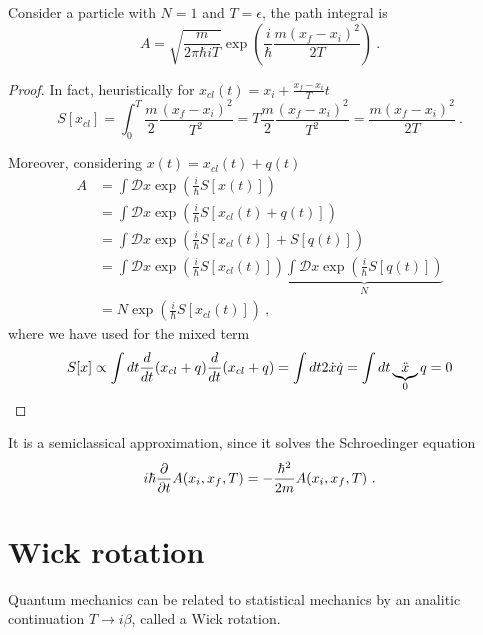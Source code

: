     Consider a particle with $N = 1$ and $T = \epsilon$, the path integral is 
    \begin{equation*}
        A = \sqrt{\frac{m}{2\pi\hbar i T}} \exp(\frac{i}{\hbar} \frac{m(x_f - x_i)^2}{2T}) ~.
    \end{equation*}
    \begin{proof}
        In fact, heuristically for $x_{cl} (t) = x_i + \frac{x_f - x_i}{T} t$
        \begin{equation*}
            S[x_{cl}] = \int_0^T \frac{m}{2} \frac{(x_f - x_i)^2}{T^2} = T \frac{m}{2} \frac{(x_f - x_i)^2}{T^2} =  \frac{m(x_f - x_i)^2}{2T} ~.
        \end{equation*}

        Moreover, considering $x(t) = x_{cl}(t) + q(t)$
        \begin{equation*}
        \begin{aligned}
            A & = \int \mathcal D x \exp (\frac{i}{\hbar} S[x(t)]) \\ & = \int \mathcal D x \exp (\frac{i}{\hbar} S[x_{cl}(t) + q(t)]) \\ & = \int \mathcal D x \exp (\frac{i}{\hbar} S[x_{cl}(t)] + S [q(t)]) \\ & = \int \mathcal D x \exp (\frac{i}{\hbar} S[x_{cl}(t)]) \underbrace{\int \mathcal D x \exp (\frac{i}{\hbar} S [q(t)])}_N \\ & = N \exp(\frac{i}{\hbar} S[x_{cl}(t)]) ~,
        \end{aligned}
        \end{equation*}
        where we have used for the mixed term
        \begin{equation*}
            S[x] \propto \int dt \frac{d}{dt} (x_{cl} + q) \frac{d}{dt} (x_{cl} + q) = \int dt 2 \dot x \dot q = \int dt \underbrace{\ddot x}_0 q = 0
        \end{equation*}
    \end{proof}
    It is a semiclassical approximation, since it solves the Schroedinger equation 
    \begin{equation*}
        i \hbar \frac{\partial}{\partial t} A(x_i, x_f, T) = - \frac{\hbar^2}{2m} A(x_i, x_f, T) ~.
    \end{equation*}

\chapter{Wick rotation} 

    Quantum mechanics can be related to statistical mechanics by an analitic continuation $T \rightarrow i \beta$, called a Wick rotation. 

